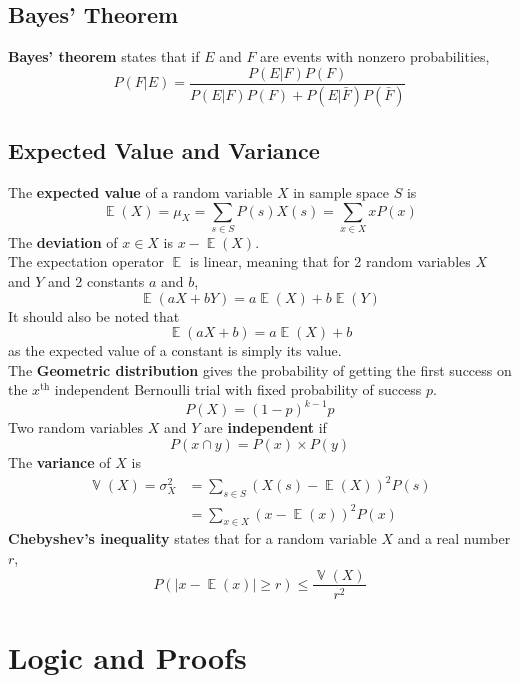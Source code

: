 \documentclass[12pt, A4, twocolumn]{article}
\DeclareMathOperator{\Exp}{\mathbb{E}}
\DeclareMathOperator{\Var}{\mathbb{V}}
\newcommand{\supt}[2]{#1^{\text{#2}}}
\begin{document}
		\subsection{Bayes' Theorem}
			\textbf{Bayes' theorem} states that if \(E\) and \(F\) are events with nonzero probabilities,
				\[P(F | E) = \frac{P(E | F)P(F)}{P(E | F)P(F) + P(E|\bar{F})P(\bar{F})}\]
		\subsection{Expected Value and Variance}
			The \textbf{expected value} of a random variable \(X\) in sample space \(S\) is
				\[
					\Exp(X) = \mu_X 
						= \sum_{s \in S}P(s)X(s)
						= \sum_{x \in X}xP(x)
				\]
				The \textbf{deviation} of \(x \in X\) is \(x - \Exp(X)\). \\
				The expectation operator \(\Exp\) is linear, meaning that for 2 random variables \(X\) and \(Y\) and 2 constants \(a\) and \(b\),
				\[\Exp(aX + bY) = a\Exp(X) + b\Exp(Y)\]
				It should also be noted that
				\[\Exp(aX + b) = a\Exp(X) + b\]
				as the expected value of a constant is simply its value. \\
			The \textbf{Geometric distribution} gives the probability of getting the first success on the \(\supt{x}{th}\) independent Bernoulli trial with fixed probability of success \(p\). \\
				\[P(X) = (1 - p)^{k - 1}p \tag{geometric}\]
			Two random variables \(X\) and \(Y\) are \textbf{independent} if
				\[P(x \cap y) = P(x) \times P(y)\]
			The \textbf{variance} of \(X\) is
				\begin{align*}
					\Var(X) = \sigma^2_X &= \sum_{s \in S}(X(s) - \Exp(X))^2P(s) \\
						&= \sum_{x \in X}(x - \Exp(x))^2P(x)
				\end{align*}
			\textbf{Chebyshev's inequality} states that for a random variable \(X\) and a real number \(r\),
				\[P(|x - \Exp(x)| \ge r) \le \frac{\Var(X)}{r^2}\]
	\setcounter{section}{0}
	\section{Logic and Proofs}
		
\end{document}
